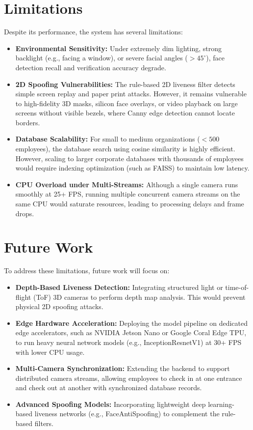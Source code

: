 \section{Limitations}
Despite its performance, the system has several limitations:
\begin{itemize}
    \item \textbf{Environmental Sensitivity:} Under extremely dim lighting, strong backlight (e.g., facing a window), or severe facial angles ($>45^\circ$), face detection recall and verification accuracy degrade.
    \item \textbf{2D Spoofing Vulnerabilities:} The rule-based 2D liveness filter detects simple screen replay and paper print attacks. However, it remains vulnerable to high-fidelity 3D masks, silicon face overlays, or video playback on large screens without visible bezels, where Canny edge detection cannot locate borders.
    \item \textbf{Database Scalability:} For small to medium organizations ($<500$ employees), the database search using cosine similarity is highly efficient. However, scaling to larger corporate databases with thousands of employees would require indexing optimization (such as FAISS) to maintain low latency.
    \item \textbf{CPU Overload under Multi-Streams:} Although a single camera runs smoothly at 25+ FPS, running multiple concurrent camera streams on the same CPU would saturate resources, leading to processing delays and frame drops.
\end{itemize}

\section{Future Work}
To address these limitations, future work will focus on:
\begin{itemize}
    \item \textbf{Depth-Based Liveness Detection:} Integrating structured light or time-of-flight (ToF) 3D cameras to perform depth map analysis. This would prevent physical 2D spoofing attacks.
    \item \textbf{Edge Hardware Acceleration:} Deploying the model pipeline on dedicated edge accelerators, such as NVIDIA Jetson Nano or Google Coral Edge TPU, to run heavy neural network models (e.g., InceptionResnetV1) at 30+ FPS with lower CPU usage.
    \item \textbf{Multi-Camera Synchronization:} Extending the backend to support distributed camera streams, allowing employees to check in at one entrance and check out at another with synchronized database records.
    \item \textbf{Advanced Spoofing Models:} Incorporating lightweight deep learning-based liveness networks (e.g., FaceAntiSpoofing) to complement the rule-based filters.
\end{itemize}
